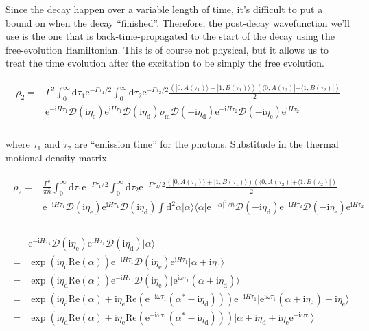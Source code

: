 \documentclass[10pt,fleqn]{article}
\newcommand{\ud}{\mathrm{d}}
\newcommand{\ue}{\mathrm{e}}
\newcommand{\ui}{\mathrm{i}}
\newcommand{\eqar}[1]
{
  \begin{align}
    #1
  \end{align}
}
\newcommand{\paren}[1]{{\left({#1}\right)}}
\newcommand{\abs}[1]{{\left|{#1}\right|}}
\begin{document}
Since the decay happen over a variable length of time,
it's difficult to put a bound on when the decay ``finished''.
Therefore, the post-decay wavefunction we'll use is the one that is
back-time-propagated to the start of the decay using the free-evolution Hamiltonian.
This is of course not physical, but it allows us to treat the time evolution
after the excitation to be simply the free evolution.
\eqar{
  \begin{split}
    \rho_2=&\Gamma^2\int_0^\infty\ud\tau_1\ue^{-\Gamma\tau_1/2}\int_0^\infty\ud\tau_2\ue^{-\Gamma\tau_2/2}\frac{\paren{|0,A(\tau_1)\rangle+|1,B(\tau_1)\rangle}\paren{\langle 0,A(\tau_2)|+\langle 1,B(\tau_2)|}}{2}\\
           &\ue^{-\ui H\tau_1}\mathcal{D}(\ui\eta_{\mathrm{e}})\ue^{\ui H\tau_1}\mathcal{D}(\ui\eta_{\mathrm{d}})\rho_{\mathrm{m}}\mathcal{D}(-\ui\eta_{\mathrm{d}})
             \ue^{-\ui H\tau_2}\mathcal{D}(-\ui\eta_{\mathrm{e}})\ue^{\ui H\tau_2}\\
  \end{split}
}
where $\tau_1$ and $\tau_2$ are ``emission time'' for the photons.
Substitude in the thermal motional density matrix.
\eqar{
  \begin{split}
    \rho_2=&\frac{\Gamma^2}{\pi {\bar n}}\int_0^\infty\ud\tau_1\ue^{-\Gamma\tau_1/2}\int_0^\infty\ud\tau_2\ue^{-\Gamma\tau_2/2}\frac{\paren{|0,A(\tau_1)\rangle+|1,B(\tau_1)\rangle}\paren{\langle 0,A(\tau_2)|+\langle 1,B(\tau_2)|}}{2}\\
           &\ue^{-\ui H\tau_1}\mathcal{D}(\ui\eta_{\mathrm{e}})\ue^{\ui H\tau_1}\mathcal{D}(\ui\eta_{\mathrm{d}})\int\ud^2\alpha |\alpha\rangle\langle\alpha|\ue^{-\abs{\alpha}^2/{\bar n}}\mathcal{D}(-\ui\eta_{\mathrm{d}})
             \ue^{-\ui H\tau_2}\mathcal{D}(-\ui\eta_{\mathrm{e}})\ue^{\ui H\tau_2}\\
  \end{split}
}
\eqar{
  \begin{split}
    &\ue^{-\ui H\tau_1}\mathcal{D}(\ui\eta_{\mathrm{e}})\ue^{\ui H\tau_1}\mathcal{D}(\ui\eta_{\mathrm{d}})|\alpha\rangle\\
    =&\exp\paren{\ui\eta_{\mathrm{d}}\mathrm{Re}(\alpha)}
       \ue^{-\ui H\tau_1}\mathcal{D}(\ui\eta_{\mathrm{e}})\ue^{\ui H\tau_1}
       |\alpha+\ui\eta_{\mathrm{d}}\rangle\\
    =&\exp\paren{\ui\eta_{\mathrm{d}}\mathrm{Re}(\alpha)}
       \ue^{-\ui H\tau_1}\mathcal{D}(\ui\eta_{\mathrm{e}})
       |\ue^{\ui\omega\tau_1}(\alpha+\ui\eta_{\mathrm{d}})\rangle\\
    =&\exp\paren{\ui\eta_{\mathrm{d}}\mathrm{Re}(\alpha)+\ui\eta_{\mathrm{e}}\mathrm{Re}(\ue^{-\ui\omega\tau_1}(\alpha^*-\ui\eta_{\mathrm{d}}))}
       \ue^{-\ui H\tau_1}
       |\ue^{\ui\omega\tau_1}(\alpha+\ui\eta_{\mathrm{d}})+\ui\eta_{\mathrm{e}}\rangle\\
    =&\exp\paren{\ui\eta_{\mathrm{d}}\mathrm{Re}(\alpha)+\ui\eta_{\mathrm{e}}\mathrm{Re}(\ue^{-\ui\omega\tau_1}(\alpha^*-\ui\eta_{\mathrm{d}}))}
       |\alpha+\ui\eta_{\mathrm{d}}+\ui\eta_{\mathrm{e}}\ue^{-\ui\omega\tau_1}\rangle\\
  \end{split}
}
\end{document}
